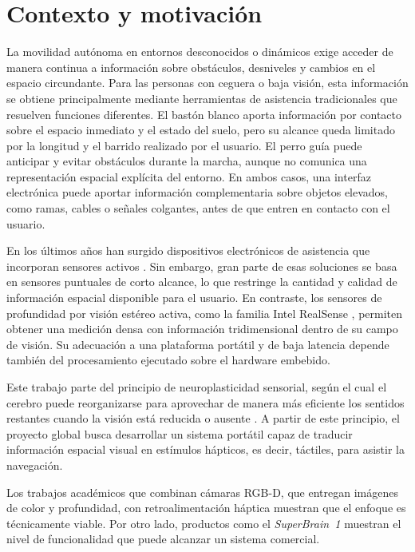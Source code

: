 \section{Contexto y motivación}

La movilidad autónoma en entornos desconocidos o dinámicos exige acceder de manera continua a
información sobre obstáculos, desniveles y cambios en el espacio circundante. Para las personas
con ceguera o baja visión, esta información se obtiene principalmente mediante herramientas de
asistencia tradicionales que resuelven funciones diferentes. El bastón blanco
aporta información por contacto sobre el espacio inmediato y el estado del suelo, pero su alcance
queda limitado por la longitud y el barrido realizado por el usuario. El perro guía puede anticipar
y evitar obstáculos durante la marcha, aunque no comunica una representación espacial explícita
del entorno. En ambos casos, una interfaz electrónica puede aportar información complementaria
sobre objetos elevados, como ramas, cables o señales colgantes, antes de que entren en contacto con
el usuario.

En los últimos años han surgido dispositivos electrónicos de asistencia que incorporan sensores
activos \cite{Santos2023, Petsiuk2019UltrasoundNavigation}.
Sin embargo, gran parte de esas soluciones se basa en sensores puntuales de corto alcance, lo que
restringe la cantidad y calidad de información espacial disponible para el usuario. En contraste,
los sensores de profundidad por visión estéreo activa, como la familia Intel RealSense
\cite{RS-D400}, permiten obtener una medición densa con información tridimensional dentro de su
campo de visión. Su adecuación a una plataforma portátil y de baja latencia depende también
del procesamiento ejecutado sobre el hardware embebido.

Este trabajo parte del principio de neuroplasticidad sensorial, según el cual el cerebro puede
reorganizarse para aprovechar de manera más eficiente los sentidos restantes cuando la visión está
reducida o ausente \cite{BachyRita1969}.
A partir de este principio, el proyecto global busca desarrollar un sistema portátil capaz de
traducir información espacial visual en estímulos hápticos, es decir, táctiles, para asistir la
navegación.

Los trabajos académicos que combinan cámaras RGB-D, que entregan imágenes de color y profundidad,
con retroalimentación háptica \cite{Lee2016RGBD, Zhang2021DVIO} muestran que el enfoque es
técnicamente viable. Por otro lado, productos como el \emph{SuperBrain~1}
\cite{SeventhSense2024SuperBrain} muestran el nivel de funcionalidad que puede alcanzar un sistema
comercial.

